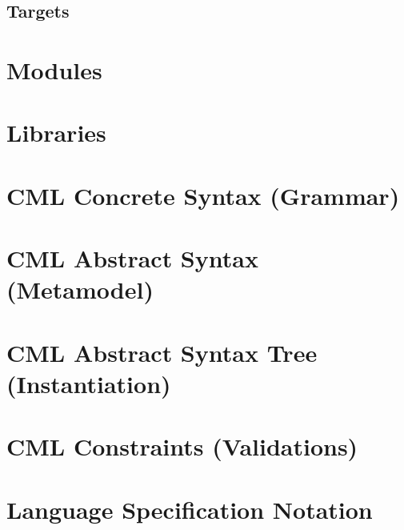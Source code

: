 \documentclass[a4paper,oneside,12pt, extrafontsizes]{memoir}
\theoremstyle{definition}
\theoremstyle{definition}
\theoremstyle{definition}
\theoremstyle{definition}
\theoremstyle{definition}
\begin{document}
\section{Targets}
\label{sec:targets}

\chapter{Modules}
\label{ch:modules}

\chapter{Libraries}
\label{ch:libraries}

\appendix

\chapter{CML Concrete Syntax (Grammar)}
\label{apx:concrete-syntax}


\chapter{CML Abstract Syntax (Metamodel)}
\label{apx:abstract-syntax}


\chapter{CML Abstract Syntax Tree (Instantiation)}
\label{apx:ast}


\chapter{CML Constraints (Validations)}
\label{apx:ocl}


\chapter{Language Specification Notation}
\label{apx:lsl}


\backmatter



\end{document}
